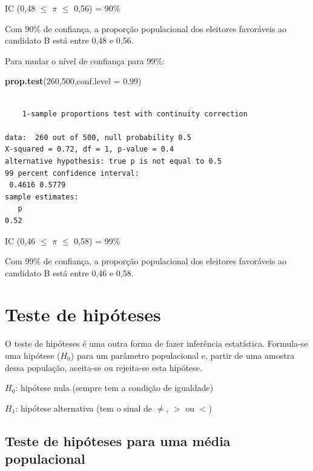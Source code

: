 \documentclass[12pt,brazil,oneside]{book}
\newenvironment{Shaded}{\begin{snugshade}}{\end{snugshade}}
\newcommand{\DataTypeTok}[1]{\textcolor[rgb]{0.13,0.29,0.53}{#1}}
\newcommand{\DecValTok}[1]{\textcolor[rgb]{0.00,0.00,0.81}{#1}}
\newcommand{\FloatTok}[1]{\textcolor[rgb]{0.00,0.00,0.81}{#1}}
\newcommand{\KeywordTok}[1]{\textcolor[rgb]{0.13,0.29,0.53}{\textbf{#1}}}
\newcommand{\NormalTok}[1]{#1}
\begin{document}
IC (0,48 \(\leq\) \(\pi\) \(\leq\) 0,56) = 90\%

Com 90\% de confiança, a proporção populacional dos eleitores favoráveis ao candidato B está entre 0,48 e 0,56.

Para mudar o nível de confiança para 99\%:

\begin{Shaded}
\begin{Highlighting}[]
\KeywordTok{prop.test}\NormalTok{(}\DecValTok{260}\NormalTok{,}\DecValTok{500}\NormalTok{,}\DataTypeTok{conf.level =} \FloatTok{0.99}\NormalTok{)}
\end{Highlighting}
\end{Shaded}

\begin{verbatim}

    1-sample proportions test with continuity correction

data:  260 out of 500, null probability 0.5
X-squared = 0.72, df = 1, p-value = 0.4
alternative hypothesis: true p is not equal to 0.5
99 percent confidence interval:
 0.4616 0.5779
sample estimates:
   p 
0.52 
\end{verbatim}

IC (0,46 \(\leq\) \(\pi\) \(\leq\) 0,58) = 99\%

Com 99\% de confiança, a proporção populacional dos eleitores favoráveis ao candidato B está entre 0,46 e 0,58.

\hypertarget{teste-de-hipoteses}{%
\section{Teste de hipóteses}\label{teste-de-hipoteses}}

O teste de hipóteses é uma outra forma de fazer inferência estatística. Formula-se uma hipótese (\(H_0\)) para um parâmetro populacional e, partir de uma amostra dessa população, aceita-se ou rejeita-se esta hipótese.

\textbf{\(H_0\)}: hipótese nula (sempre tem a condição de igualdade)

\textbf{\(H_1\)}: hipótese alternativa (tem o sinal de \(\neq\), \(>\) ou \(<\))

\hypertarget{teste-de-hipoteses-para-uma-media-populacional}{%
\subsection{Teste de hipóteses para uma média populacional}\label{teste-de-hipoteses-para-uma-media-populacional}}
\end{document}
